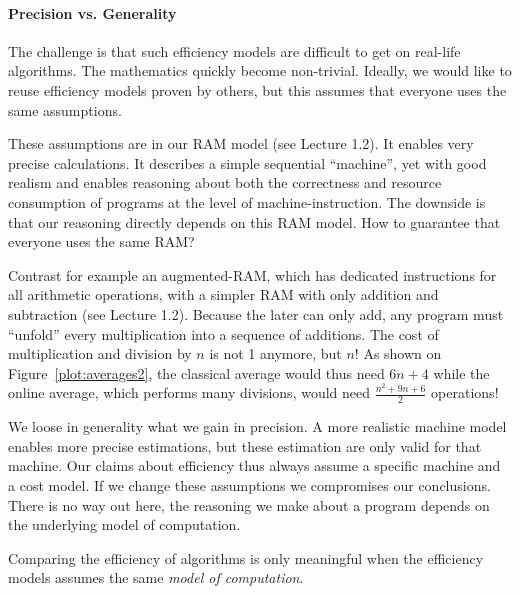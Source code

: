 \documentclass{aldast}
\begin{document}
\paragraph{Precision vs. Generality}

The challenge is that such efficiency models are difficult to get on
real-life algorithms. The mathematics quickly become
non-trivial. Ideally, we would like to reuse efficiency models proven by
others, but this assumes that everyone uses the same assumptions.

These assumptions are in our RAM model (see Lecture 1.2). It enables
very precise calculations. It describes a simple sequential
``machine'', yet with good realism and enables reasoning about both
the correctness and resource consumption of programs at the level of
machine-instruction. The downside is that our reasoning directly
depends on this RAM model. How to guarantee that everyone uses the
same RAM?


Contrast for example an augmented-RAM, which has dedicated
instructions for all arithmetic operations, with a simpler RAM with
only addition and subtraction (see Lecture 1.2). Because the later can
only add, any program must ``unfold'' every multiplication into a
sequence of additions. The cost of multiplication and division by $n$
is not 1 anymore, but $n$! As shown on Figure~\ref{plot:averages2},
the classical average would thus need $6n+4$ while the online average,
which performs many divisions, would need $\frac{n^2+9n+6}{2}$
operations!

We loose in generality what we gain in precision. A more realistic
machine model enables more precise estimations, but these estimation
are only valid for that machine. Our claims about efficiency thus
always assume a specific machine and a cost model. If we change these
assumptions we compromises our conclusions. There is no way out here,
the reasoning we make about a program depends on the underlying model
of computation.

\begin{takeaway}
  Comparing the efficiency of algorithms is only meaningful when the
  efficiency models assumes the same \emph{model of computation}.
\end{takeaway}
\end{document}
